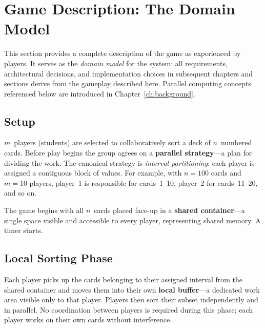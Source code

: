 \section{Game Description: The Domain Model}
\label{sec:game-description}

This section provides a complete description of the game as experienced by players. It serves as the \emph{domain model} for the system: all requirements, architectural decisions, and implementation choices in subsequent chapters and sections derive from the gameplay described here. Parallel computing concepts referenced below are introduced in Chapter~\ref{ch:background}.

\subsection{Setup}
\label{subsec:game-setup}

$m$~players (students) are selected to collaboratively sort a deck of $n$~numbered cards. Before play begins the group agrees on a \textbf{parallel strategy}---a plan for dividing the work. The canonical strategy is \emph{interval partitioning}: each player is assigned a contiguous block of values. For example, with $n = 100$ cards and $m = 10$ players, player~1 is responsible for cards~1--10, player~2 for cards~11--20, and so on.

The game begins with all $n$~cards placed face-up in a \textbf{shared container}---a single space visible and accessible to every player, representing shared memory. A timer starts.

\subsection{Local Sorting Phase}
\label{subsec:local-sorting-phase}

Each player picks up the cards belonging to their assigned interval from the shared container and moves them into their own \textbf{local buffer}---a dedicated work area visible only to that player. Players then sort their subset independently and in parallel. No coordination between players is required during this phase; each player works on their own cards without interference.

